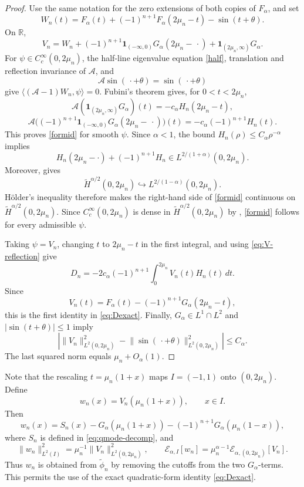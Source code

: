 \documentclass[11pt]{amsart}
\numberwithin{equation}{section}
\theoremstyle{remark}
\newcommand{\R}{\mathbb R}
\newcommand{\one}{\mathbf 1}
\newcommand{\wt}{\widetilde}
\newcommand{\norm}[2][]{\lVert #2\rVert_{#1}}
\newcommand{\calE}{\mathcal E}
\begin{document}
\begin{proof}
Use the same notation for the zero extensions of both copies of $F_\alpha$,
and set
\[
 W_n(t)=F_\alpha(t)+(-1)^{n+1}F_\alpha(2\mu_n-t)-\sin(t+\theta).
\]
On $\R$,
\[
 V_n=W_n
 +(-1)^{n+1}\one_{(-\infty,0)}G_\alpha(2\mu_n-\,\cdot)
 +\one_{(2\mu_n,\infty)}G_\alpha.
\]
For $\psi\in C_c^\infty(0,2\mu_n)$, the half-line eigenvalue equation
\eqref{half}, translation and reflection invariance of $\mathcal A$, and
\[
 \mathcal A\sin(\,\cdot+\theta)=\sin(\,\cdot+\theta)
\]
give $\langle(\mathcal A-1)W_n,\psi\rangle=0$.  Fubini's theorem gives,
for $0<t<2\mu_n$,
\[
 \mathcal A(\one_{(2\mu_n,\infty)}G_\alpha)(t)
 =-c_\alpha H_n(2\mu_n-t),
\]
\[
 \mathcal A\bigl((-1)^{n+1}\one_{(-\infty,0)}
 G_\alpha(2\mu_n-\,\cdot)\bigr)(t)
 =-c_\alpha(-1)^{n+1}H_n(t).
\]
This proves \eqref{formid} for smooth $\psi$.  Since $\alpha<1$, the bound
$H_n(\rho)\le C_\alpha\rho^{-\alpha}$ implies
\[
 H_n(2\mu_n-\cdot)+(-1)^{n+1}H_n
 \in L^{2/(1+\alpha)}(0,2\mu_n).
\]
Moreover, \cite[Theorem~6.5]{DNPV} gives
\[
 \wt H^{\alpha/2}(0,2\mu_n)
 \hookrightarrow L^{2/(1-\alpha)}(0,2\mu_n).
\]
H\"older's inequality therefore makes the right-hand side of \eqref{formid}
continuous on $\wt H^{\alpha/2}(0,2\mu_n)$.  Since
$C_c^\infty(0,2\mu_n)$ is dense in $\wt H^{\alpha/2}(0,2\mu_n)$ by
\cite[Theorem~3.29(ii)]{McLean}, \eqref{formid} follows for every admissible
$\psi$.

Taking $\psi=V_n$, changing $t$ to $2\mu_n-t$ in the first integral, and
using \eqref{eq:V-reflection} give
\[
 D_n=-2c_\alpha(-1)^{n+1}\int_0^{2\mu_n}V_n(t)H_n(t)\,dt.
\]
Since
\[
 V_n(t)=F_\alpha(t)-(-1)^{n+1}G_\alpha(2\mu_n-t),
\]
this is the first identity in \eqref{eq:Dexact}.  Finally,
$G_\alpha\in L^1\cap L^2$ and $|\sin(t+\theta)|\le1$ imply
\[
 \left|\norm[L^2(0,2\mu_n)]{V_n}^2
 -\norm[L^2(0,2\mu_n)]{\sin(\,\cdot+\theta)}^2\right|
 \le C_\alpha.
\]
The last squared norm equals $\mu_n+O_\alpha(1)$.
\end{proof}

Note that the rescaling $t=\mu_n(1+x)$ maps $I=(-1,1)$ onto
$(0,2\mu_n)$. Define
\[
 w_n(x)=V_n(\mu_n(1+x)),\qquad x\in I.
\]
Then
\begin{equation}\label{eq:w}
 w_n(x)=S_n(x)-G_\alpha(\mu_n(1+x))
 -(-1)^{n+1}G_\alpha(\mu_n(1-x)),
\end{equation}
where $S_n$ is defined in \eqref{eq:qmode-decomp}, and
\begin{equation}\label{eq:scaling}
 \norm[L^2(I)]{w_n}^2=\mu_n^{-1}
 \norm[L^2(0,2\mu_n)]{V_n}^2,
 \qquad
 \calE_{\alpha,I}[w_n]=\mu_n^{\alpha-1}
 \calE_{\alpha,(0,2\mu_n)}[V_n].
\end{equation}
Thus $w_n$ is obtained from $\wt\phi_n$ by removing the cutoffs from the two
$G_\alpha$-terms.  This permits the use of the exact quadratic-form identity
\eqref{eq:Dexact}.
\end{document}
